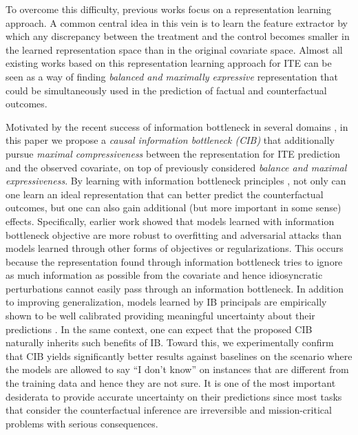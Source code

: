 \documentclass{article}
\begin{document}
    To overcome this difficulty, previous works focus on a representation learning approach. A common central idea in this vein is to learn the feature extractor by which any discrepancy between the treatment and the control becomes smaller in the learned representation space than in the original covariate space. Almost all existing works based on this representation learning approach for ITE can be seen as a way of finding \emph{balanced and maximally expressive} representation that could be simultaneously used in the prediction of factual and counterfactual outcomes.
  
  


Motivated by the recent success of information bottleneck in several domains \cite{Alemi17, alemi2018, michael2018on}, in this paper we propose a \emph{causal information bottleneck (CIB)} that additionally pursue \emph{maximal compressiveness} between the representation for ITE prediction and the observed covariate, on top of previously considered \emph{balance and maximal expressiveness}.   
By learning with information bottleneck principles \cite{Tishby99}, not only can one learn an ideal representation that can better predict the counterfactual outcomes, but one can also gain additional (but more important in some sense) effects. Specifically, earlier work \cite{Alemi17} showed that models learned with information bottleneck objective are more robust to overfitting and adversarial attacks than models learned through other forms of objectives or regularizations. This occurs because the representation found through information bottleneck tries to ignore as much information as possible from the covariate and hence idiosyncratic perturbations cannot easily pass through an information bottleneck. In addition to improving generalization, models learned by IB principals are empirically shown to be well calibrated providing meaningful uncertainty about their predictions \cite{alemi2018}. In the same context, one can expect that the proposed CIB naturally inherits such benefits of IB. Toward this, we experimentally confirm that CIB yields significantly better results against baselines on the scenario where the models are allowed to say ``I don't know'' on instances that are different from the training data and hence they are not sure. It is one of the most important desiderata to provide accurate uncertainty on their predictions since most tasks that consider the counterfactual inference are irreversible and mission-critical problems with serious consequences.
\end{document}
